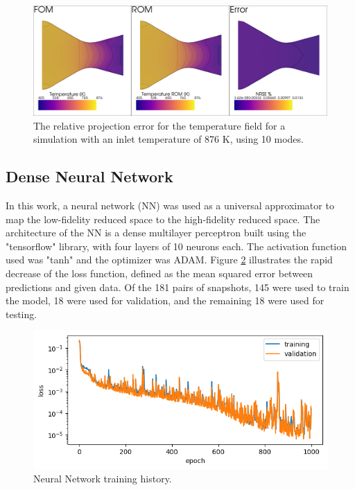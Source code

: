 \documentclass[10pt,fleqn,a4paper,twoside]{article}
\begin{document}
\begin{figure}[!ht]
	\begin{center}
		\includegraphics[width=\textwidth]{images/projection_error.png}
		\caption{The relative projection error for the temperature field for a simulation with an inlet temperature of 876 K, using 10 modes.}
        \label{fig:projectionerror}
	\end{center}  
\end{figure}

\subsection{Dense Neural Network}

In this work, a neural network (NN)\cite{Hornik1989} was used as a universal approximator to map the low-fidelity reduced space to the high-fidelity reduced space. The architecture of the NN is a dense multilayer perceptron built using the "tensorflow" library, with four layers of 10 neurons each. The activation function used was "tanh" and the optimizer was ADAM. Figure \ref{fig:history} illustrates the rapid decrease of the loss function, defined as the mean squared error between predictions and given data. Of the 181 pairs of snapshots, 145 were used to train the model, 18 were used for validation, and the remaining 18 were used for testing.

\begin{figure}[!ht]
	\begin{center}
		\includegraphics[width=\textwidth]{images/history.png}
		\caption{Neural Network training history.}
        \label{fig:history}
	\end{center}  
\end{figure}
\end{document}
